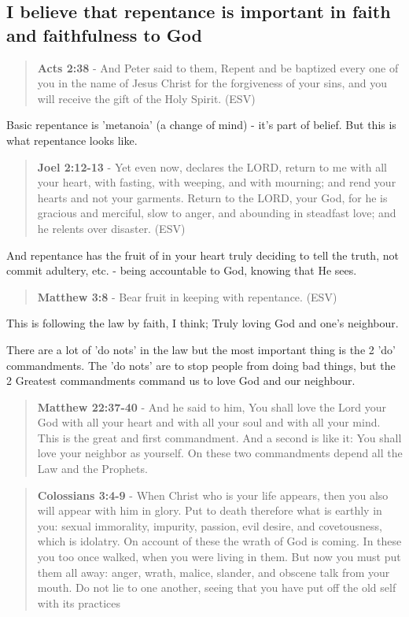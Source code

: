 \documentclass[11pt]{article}
\begin{document}
\subsection{I believe that repentance is important in faith and faithfulness to God}
\label{sec:org9acb861}
\begin{quote}
\textbf{Acts 2:38} - And Peter said to them, Repent and be baptized every one of you in the name of Jesus Christ for the forgiveness of your sins, and you will receive the gift of the Holy Spirit. (ESV)
\end{quote}

Basic repentance is 'metanoia' (a change of mind) - it's part of belief.
But this is what repentance looks like.

\begin{quote}
\textbf{Joel 2:12-13} - Yet even now, declares the LORD, return to me with all your heart, with fasting, with weeping, and with mourning; and rend your hearts and not your garments. Return to the LORD, your God, for he is gracious and merciful, slow to anger, and abounding in steadfast love; and he relents over disaster. (ESV)
\end{quote}

And repentance has the fruit of in your heart truly deciding to tell the truth, not commit adultery, etc. - being accountable to God, knowing that He sees.

\begin{quote}
\textbf{Matthew 3:8} - Bear fruit in keeping with repentance. (ESV)
\end{quote}

This is following the law by faith, I think; Truly loving God and one's neighbour.

There are a lot of 'do nots' in the law but the most important thing is the 2 'do' commandments.
The 'do nots' are to stop people from doing bad things, but the 2 Greatest commandments command us to love God and our neighbour.

\begin{quote}
\textbf{Matthew 22:37-40} - And he said to him, You shall love the Lord your God with all your heart and with all your soul and with all your mind. This is the great and first commandment. And a second is like it: You shall love your neighbor as yourself. On these two commandments depend all the Law and the Prophets.
\end{quote}

\begin{quote}
\textbf{Colossians 3:4-9} - When Christ who is your life appears, then you also will appear with him in glory. Put to death therefore what is earthly in you: sexual immorality, impurity, passion, evil desire, and covetousness, which is idolatry. On account of these the wrath of God is coming. In these you too once walked, when you were living in them. But now you must put them all away: anger, wrath, malice, slander, and obscene talk from your mouth. Do not lie to one another, seeing that you have put off the old self with its practices
\end{quote}
\end{document}
